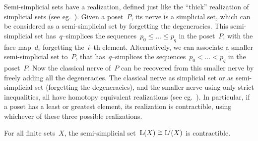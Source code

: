 \begin{rem}\label{rem:semisimple}
Semi-simplicial sets have a realization, defined just like the ``thick'' realization of simplicial sets  (see eg.~\cite{EbertRW}). Given a poset~$P$, its nerve is a simplicial set, which can be considered as a semi-simplicial set by forgetting the degeneracies. This semi-simplicial set has~$q$--simplices the sequences~\hbox{$p_0\le \dots\le p_q$} in the poset~$P$, with the face map~$d_i$ forgetting the~$i$--th element. Alternatively, we can associate a smaller semi-simplicial  set to~$P$, 
that has~$q$--simplices the sequences~$p_0< \dots< p_q$ in the poset~$P$. Now the classical nerve of~$P$ can be recovered from this smaller nerve by freely adding all the degeneracies. The classical nerve as simplicial set or as semi-simplicial set (forgetting the degeneracies), and the smaller nerve using only strict inequalities, all have homotopy equivalent realizations (see eg.~\cite[Lem.~1.7, 1.8]{EbertRW}). In particular, if a poset has a least or greatest element, its realization is contractible, using whichever of these three possible realizations. 
\end{rem}


\begin{prop}\label{expcomplex}
For all finite sets~$X$, the semi-simplicial set~$\mathrm{L}(X)\cong \mathrm{L}'(X)$ is contractible. 
\end{prop}

